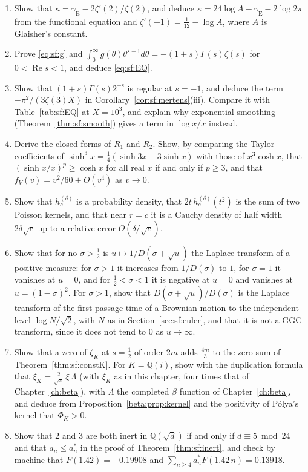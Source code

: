 \begin{enumerate}
\item Show that $\kappa=\gamma_{\mathrm E}-2\zeta'(2)/\zeta(2)$, and deduce $\kappa=24\log A-\gamma_{\mathrm E}-2\log2\pi$ from the functional equation and $\zeta'(-1)=\frac1{12}-\log A$, where $A$ is Glaisher's constant.
\item Prove \eqref{eq:sf:g} and $\int_0^\infty g(\theta)\theta^{s-1}d\theta=-(1+s)\Gamma(s)\zeta(s)$ for $0<\operatorname{Re}s<1$, and deduce \eqref{eq:sf:EQ}.
\item Show that $(1+s)\Gamma(s)2^{-s}$ is regular at $s=-1$, and deduce the term $-\pi^2/(3\zeta(3)X)$ in Corollary~\ref{cor:sf:mertens}(iii). Compare it with Table~\ref{tab:sf:EQ} at $X=10^3$, and explain why exponential smoothing (Theorem~\ref{thm:sf:smooth}) gives a term in $\log x/x$ instead.
\item Derive the closed forms of $R_1$ and $R_2$. Show, by comparing the Taylor coefficients of $\sinh^3x=\frac14(\sinh3x-3\sinh x)$ with those of $x^3\cosh x$, that $(\sinh x/x)^p\ge\cosh x$ for all real $x$ if and only if $p\ge3$, and that $f_V(v)=v^2/60+O(v^4)$ as $v\to0$.
\item Show that $h^{(\delta)}_c$ is a probability density, that $2t\,h^{(\delta)}_c(t^2)$ is the sum of two Poisson kernels, and that near $r=c$ it is a Cauchy density of half width $2\delta\sqrt c$ up to a relative error $O(\delta/\sqrt c)$.
\item Show that for no $\sigma>\frac12$ is $u\mapsto1/D(\sigma+\sqrt u)$ the Laplace transform of a positive measure: for $\sigma>1$ it increases from $1/D(\sigma)$ to $1$, for $\sigma=1$ it vanishes at $u=0$, and for $\frac12<\sigma<1$ it is negative at $u=0$ and vanishes at $u=(1-\sigma)^2$. For $\sigma>1$, show that $D(\sigma+\sqrt u)/D(\sigma)$ is the Laplace transform of the first passage time of a Brownian motion to the independent level $\log N/\sqrt2$, with $N$ as in Section~\ref{sec:sf:euler}, and that it is not a GGC transform, since it does not tend to $0$ as $u\to\infty$.
\item Show that a zero of $\zeta_K$ at $s=\frac12$ of order $2m$ adds $\frac{4m}3$ to the zero sum of Theorem~\ref{thm:sf:constK}. For $K=\mathbb Q(i)$, show with the duplication formula that $\xi_K=\frac2{\sqrt\pi}\,\xi\,\Lambda$ (with $\xi_K$ as in this chapter, four times that of Chapter~\ref{ch:beta}), with $\Lambda$ the completed $\beta$ function of Chapter~\ref{ch:beta}, and deduce from Proposition~\ref{beta:prop:kernel} and the positivity of P\'olya's kernel that $\Phi_K>0$.
\item Show that $2$ and $3$ are both inert in $\mathbb Q(\sqrt d)$ if and only if $d\equiv5\bmod24$ and that $a_n\le a_n^*$ in the proof of Theorem~\ref{thm:sf:inert}, and check by machine that $F(1.42)=-0.19908$ and $\sum_{n\ge4}a_n^*F(1.42\,n)=0.13918$.
\end{enumerate}

